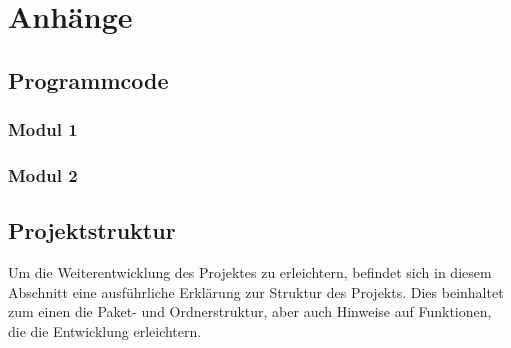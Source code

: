 

\renewcommand{\thechapter}{\Alph{chapter}}
\renewcommand{\thesection}{\Alph{section}}
\renewcommand{\thesubsection}{\Alph{section}.\arabic{subsection}}
\setcounter{section}{0} %

\chapter{Anhänge}\label{chapter:appendix}


\section{Programmcode}\label{sec:appendix_A}

\subsection{Modul 1}

\subsection{Modul 2}

\section{Projektstruktur}\label{sec:appendix_structure}
Um die Weiterentwicklung des Projektes zu erleichtern, befindet sich in diesem Abschnitt eine ausführliche Erklärung zur Struktur des Projekts. Dies beinhaltet zum einen die Paket- und Ordnerstruktur, aber auch Hinweise auf Funktionen, die die Entwicklung erleichtern.
